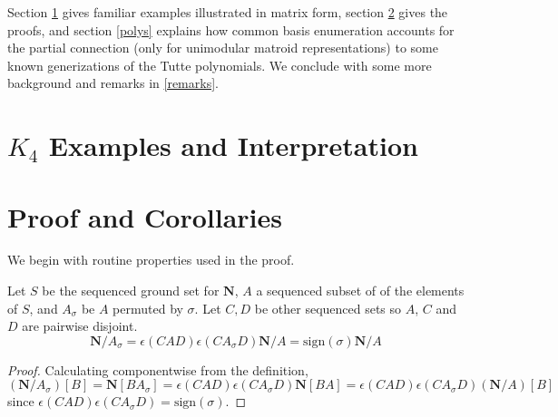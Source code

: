 \documentclass[Unicode]{cedram-alco}
\newcommand{\ext}[1]{\ensuremath{\mathbf{#1}}}
\begin{document}
Section \ref{examples} gives familiar examples illustrated in matrix form,
section \ref{proofs} gives the proofs, and section \ref{polys} explains
how common basis enumeration accounts for the partial connection
(only for unimodular matroid representations) to some known generizations
of the Tutte polynomials.  We conclude with some more background and remarks
in \ref{remarks}.


\section{$K_4$ Examples and Interpretation}\label{examples}







\section{Proof and Corollaries}\label{proofs}

We begin with routine properties used in the proof.

    \begin{prop}
      Let $S$ be the sequenced ground set for $\ext{N}$, $A$ a sequenced subset of
      of the elements of $S$, and $A_\sigma$ be $A$ permuted by $\sigma$.  Let $C, D$ be other sequenced
      sets so $A$, $C$ and $D$ are pairwise disjoint.
      \begin{equation}\label{permuteContraction}
        \ext{N}/A_\sigma = \epsilon(CAD)\epsilon(CA_\sigma D)\ext{N}/A = \text{sign}(\sigma)\ext{N}/A
      \end{equation}
    \end{prop}
    \begin{proof}
      Calculating componentwise from the definition,
      \[
      (\ext{N}/A_\sigma)[B]=\ext{N}[BA_\sigma]=\epsilon(CAD)\epsilon(CA_\sigma D)\ext{N}[BA]=
      \epsilon(CAD)\epsilon(CA_\sigma D)(\ext{N}/A)[B]
      \]
      since $\epsilon(CAD)\epsilon(CA_\sigma D)=\text{sign}(\sigma)$.
    \end{proof}
\end{document}
